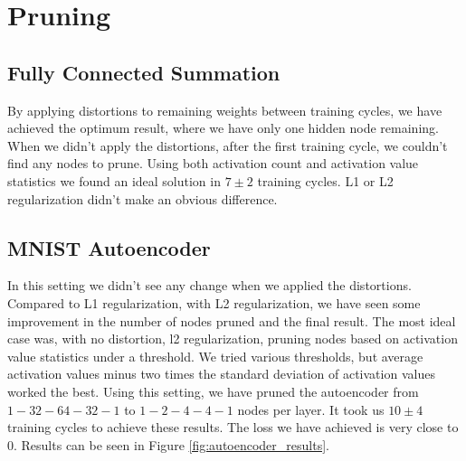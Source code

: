 \section{Pruning}
\subsection{Fully Connected Summation}
By applying distortions to remaining weights between training cycles, we have achieved the optimum result, where we have only one hidden node remaining. When we didn't apply the distortions, after the first training cycle, we couldn't find any nodes to prune. Using both activation count and activation value statistics we found an ideal solution in $7 \pm 2$ training cycles. L1 or L2 regularization didn't make an obvious difference.

\subsection{MNIST Autoencoder}
In this setting we didn't see any change when we applied the distortions. Compared to L1 regularization, with L2 regularization, we have seen some improvement in the number of nodes pruned and the final result. The most ideal case was, with no distortion, l2 regularization, pruning nodes based on activation value statistics under a threshold. We tried various thresholds, but average activation values minus two times the standard deviation of activation values worked the best. Using this setting, we have pruned the autoencoder from $1-32-64-32-1$ to $1-2-4-4-1$ nodes per layer. It took us $10\pm4$ training cycles to achieve these results. The loss we have achieved is very close to 0. Results can be seen in Figure \ref{fig:autoencoder_results}.

